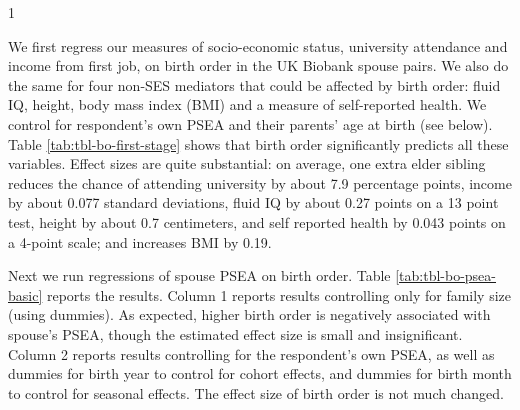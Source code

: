 \documentclass[
  12pt,
]{article}
\theoremstyle{definition}
\theoremstyle{definition}
\theoremstyle{definition}
\theoremstyle{definition}
\theoremstyle{remark}
\begin{document}
\begin{table}[ht]
\begin{centerbox}
\begin{threeparttable}
\begin{tabularx}{1\textwidth}
 \tabularnewline[-0.5pt]


\hhline{}
\end{tabularx}
\end{threeparttable}\par\end{centerbox}

\end{table}
 

We first regress our measures of socio-economic status, university attendance
and income from first job, on birth order in the UK Biobank spouse pairs. We also do
the same for four non-SES mediators that could be affected by birth order: fluid
IQ, height, body mass index (BMI) and a measure of self-reported health. We
control for respondent's own PSEA and their parents' age at birth (see below). Table
\ref{tab:tbl-bo-first-stage} shows that birth order significantly predicts all
these variables. Effect sizes are quite substantial: on average, one extra elder
sibling reduces the chance of attending university by about
7.9 percentage points, income by about
0.077 standard deviations, fluid IQ by about
0.27 points on a 13 point test, height by about
0.7 centimeters, and self reported health by
0.043 points on a 4-point scale; and increases BMI by
0.19.

Next we run regressions of spouse PSEA on birth order.
Table \ref{tab:tbl-bo-psea-basic} reports the results. Column 1
reports results controlling only for family size (using dummies). As expected,
higher birth order is negatively associated with spouse's PSEA, though the
estimated effect size is small and insignificant. Column 2 reports results
controlling for the respondent's own PSEA, as well as dummies for birth year to
control for cohort effects, and dummies for birth month to control for
seasonal effects. The effect size of birth order is not much changed.
\end{document}
